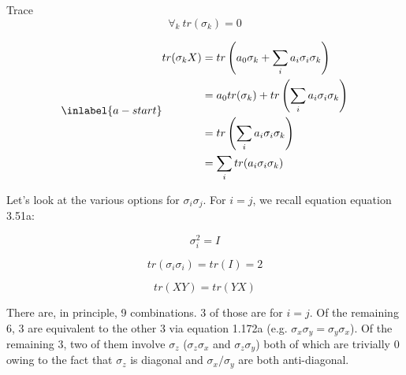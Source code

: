 \begin{answer}
\begin{answerpart}{Trace}
    \begin{equation}
      \forall_k \  tr(\sigma_k) = 0
    \end{equation}
    
    \begin{equation}
      \inlabel{a-start}
      \begin{split}
        tr(\sigma_k X)
        &= tr\left( a_0\sigma_k + \sum_i{a_i\sigma_i\sigma_k} \right) \\
        &= a_0tr(\sigma_k) + tr\left( \sum_i{a_i\sigma_i\sigma_k} \right) \\
        &= tr\left( \sum_i{a_i\sigma_i\sigma_k} \right) \\
        &= \sum_i{tr(a_i\sigma_i\sigma_k)} \\
      \end{split}
    \end{equation}

    Let's look at the various options for $\sigma_i\sigma_j$.  For
    $i=j$, we recall equation equation 3.51a:

    \begin{equation*}
      \tag{3.51a}
      \sigma_i^2 = I
    \end{equation*}

    \begin{equation}
      tr(\sigma_i\sigma_i) = tr(I) = 2
    \end{equation}

    \begin{equation*}
      \tag{1.172a}
      tr(XY) = tr(YX)
    \end{equation*}

    There are, in principle, 9 combinations.  3 of those are for $i=j$.
    Of the remaining 6, 3 are equivalent to the other 3 via equation
    1.172a (e.g. $\sigma_x\sigma_y = \sigma_y\sigma_x$).  Of the
    remaining 3, two of them involve $\sigma_z$ ($\sigma_z\sigma_x$ and
    $\sigma_z\sigma_y$) both of which are trivially 0 owing to the fact
    that $\sigma_z$ is diagonal and $\sigma_x/\sigma_y$ are both
    anti-diagonal.


\end{answerpart}
\end{answer}
